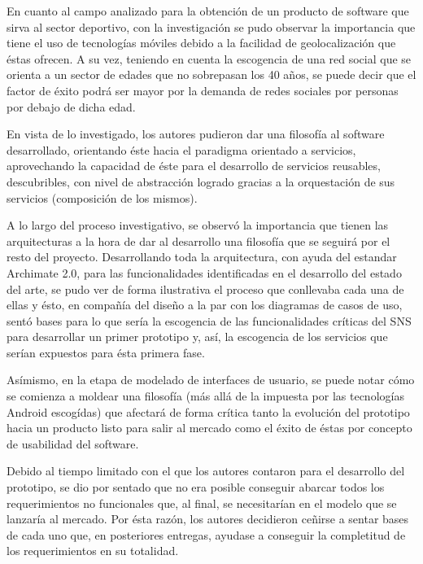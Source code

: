 En cuanto al campo analizado para la obtención de un producto de software que sirva al sector deportivo, con la investigación se pudo observar la importancia que tiene el uso de tecnologías móviles debido a la facilidad de geolocalización que éstas ofrecen. A su vez, teniendo en cuenta la escogencia de una red social que se orienta a un sector de edades que no sobrepasan los 40 años, se puede decir que el factor de éxito podrá ser mayor por la demanda de redes sociales por personas por debajo de dicha edad.

En vista de lo investigado, los autores pudieron dar una filosofía al software desarrollado, orientando éste hacia el paradigma orientado a servicios, aprovechando la capacidad de éste para el desarrollo de servicios reusables, descubribles, con nivel de abstracción logrado gracias a la orquestación de sus servicios (composición de los mismos).

A lo largo del proceso investigativo, se observó la importancia que tienen las arquitecturas a la hora de dar al desarrollo una filosofía que se seguirá por el resto del proyecto. Desarrollando toda la arquitectura, con ayuda del estandar Archimate 2.0, para las funcionalidades identificadas en el desarrollo del estado del arte, se pudo ver de forma ilustrativa el proceso que conllevaba cada una de ellas y ésto, en compañía del diseño a la par con los diagramas de casos de uso, sentó bases para lo que sería la escogencia de las funcionalidades críticas del SNS para desarrollar un primer prototipo y, así, la escogencia de los servicios que serían expuestos para ésta primera fase.

Asímismo, en la etapa de modelado de interfaces de usuario, se puede notar cómo se comienza a moldear una filosofía (más allá de la impuesta por las tecnologías Android escogídas) que afectará de forma crítica tanto la evolución del prototipo hacia un producto listo para salir al mercado como el éxito de éstas por concepto de usabilidad del software.

Debido al tiempo limitado con el que los autores contaron para el desarrollo del prototipo, se dio por sentado que no era posible conseguir abarcar todos los requerimientos no funcionales que, al final, se necesitarían en el modelo que se lanzaría al mercado. Por ésta razón, los autores decidieron ceñirse a sentar bases de cada uno que, en posteriores entregas, ayudase a conseguir la completitud de los requerimientos en su totalidad.
